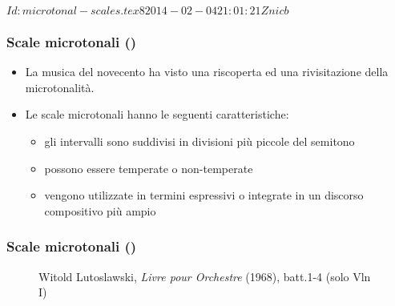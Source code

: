 %
%
\svnInfo $Id: microtonal-scales.tex 8 2014-02-04 21:01:21Z nicb $

\setcounter{ms}{0}
\begin{frame}
    \frametitle{Scale microtonali ()}

    \begin{itemize}

        \item La musica del novecento ha visto una riscoperta
            ed una rivisitazione della microtonalit\`a.
        \item Le scale microtonali hanno le seguenti caratteristiche:

            \begin{itemize}
                \item gli intervalli sono suddivisi in divisioni pi\`u piccole del semitono

                \item possono essere temperate o non-temperate

                \item vengono utilizzate in termini espressivi
                    o integrate in un discorso compositivo pi\`u ampio
            \end{itemize}
    \end{itemize}

\end{frame}

\begin{frame}
    \frametitle{Scale microtonali ()}

    \begin{center}
        \begin{figure}
            \caption{Witold Lutoslawski, \emph{Livre pour Orchestre} (1968), batt.1-4 (solo Vln I)}
        \end{figure}
    \end{center}
\end{frame}
